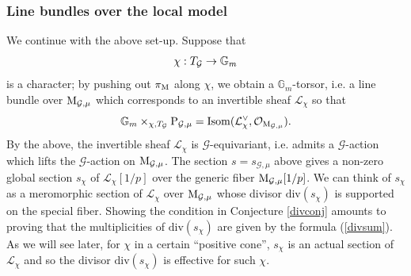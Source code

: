 \documentclass[reqno, 10pt]{amsart}
\makeatletter
\newcommand{\BG}{\ensuremath{\mathbb {G}}\xspace}
\newcommand{\CG}{\ensuremath{\mathcal {G}}\xspace}
\newcommand{\CL}{\ensuremath{\mathcal {L}}\xspace}
\newcommand{\CO}{\ensuremath{\mathcal {O}}\xspace}
\newcommand{\RP}{\ensuremath{\mathrm {P}}\xspace}
\renewcommand{\div}{{\mathrm{div}}}
\theoremstyle{definition}
\numberwithin{equation}{subsection}
\numberwithin{subsubsection}{subsection}
\renewcommand{\to}{%
   \ifbool{@display}{\longrightarrow}{\rightarrow}%
   }
\newcommand{\Mloc}{{\rm M}}
\makeatother
\begin{document}
 
 
 
 
 \subsubsection{Line bundles over the local model}\label{ss:BundlesLines} We continue with the above set-up. Suppose  that 
\[
\chi:   T_\CG\to \BG_m
\]
 is a character; by   pushing out $\pi_{\Mloc}$ along $\chi$, we obtain a $\BG_m$-torsor, i.e. a line bundle over $\Mloc_{\CG,\mu}$ which corresponds to an invertible sheaf $\CL_\chi$ so that 
 \[
 \BG_m\times_{\chi, T_\CG} \RP_{\CG,\mu}={\rm Isom}(\CL^\vee_\chi,\CO_{\Mloc_{\CG,\mu}}).
 \]
By the above, the invertible sheaf $\CL_\chi$  is $\CG $-equivariant, i.e. admits a $\CG $-action which lifts the $\CG $-action on $\Mloc_{\CG,\mu}$. The section $s=s_{\CG,\mu}$ above gives a non-zero global section $s_\chi$ of $\CL_\chi[1/p]$ over the generic fiber $\Mloc_{\CG,\mu}[1/p]$. We can think of $s_\chi$ as a meromorphic section of $\CL_\chi$ over $\Mloc_{\CG,\mu}$ whose divisor $\div(s_\chi)$ is supported on the special fiber.  Showing the condition in Conjecture \ref{divconj} amounts to proving that the multiplicities of $\div(s_\chi)$ are given by the formula (\ref{divsum}). As we will see later, for $\chi$ in a certain ``positive cone'', $s_\chi$ is an actual section of $\CL_\chi$ and so the divisor $\div(s_\chi)$ is effective for such $\chi$.
\end{document}
